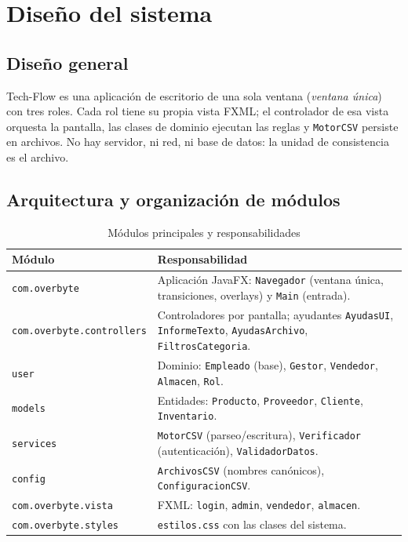\chapter{Diseño del sistema}

\section{Diseño general}
Tech-Flow es una aplicación de escritorio de una sola ventana (\emph{ventana única}) con tres roles. Cada rol tiene su propia vista FXML; el controlador de esa vista orquesta la pantalla, las clases de dominio ejecutan las reglas y \texttt{MotorCSV} persiste en archivos. No hay servidor, ni red, ni base de datos: la unidad de consistencia es el archivo.

\section{Arquitectura y organización de módulos}
\begin{table}[H]\centering\caption{Módulos principales y responsabilidades}\begin{tabular}{p{}p{}}\toprule
Módulo & Responsabilidad\\\midrule
\texttt{com.overbyte} & Aplicación JavaFX: \texttt{Navegador} (ventana única, transiciones, overlays) y \texttt{Main} (entrada).\\
\texttt{com.overbyte.controllers} & Controladores por pantalla; ayudantes \texttt{AyudasUI}, \texttt{InformeTexto}, \texttt{AyudasArchivo}, \texttt{FiltrosCategoria}.\\
\texttt{user} & Dominio: \texttt{Empleado} (base), \texttt{Gestor}, \texttt{Vendedor}, \texttt{Almacen}, \texttt{Rol}.\\
\texttt{models} & Entidades: \texttt{Producto}, \texttt{Proveedor}, \texttt{Cliente}, \texttt{Inventario}.\\
\texttt{services} & \texttt{MotorCSV} (parseo/escritura), \texttt{Verificador} (autenticación), \texttt{ValidadorDatos}.\\
\texttt{config} & \texttt{ArchivosCSV} (nombres canónicos), \texttt{ConfiguracionCSV}.\\
\texttt{com.overbyte.vista} & FXML: \texttt{login}, \texttt{admin}, \texttt{vendedor}, \texttt{almacen}.\\
\texttt{com.overbyte.styles} & \texttt{estilos.css} con las clases del sistema.\\\bottomrule\end{tabular}\end{table}

